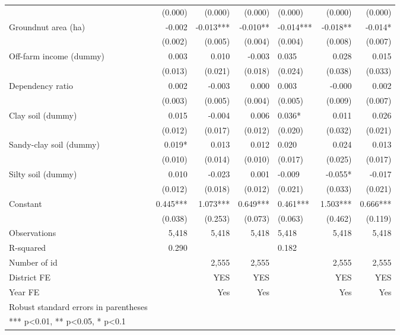 \documentclass[
]{article}
\begin{document}
\begin{landscape}
\begin{longtable}[t]{lrrrlrr}
 & (0.000) & (0.000) & (0.000) & (0.000) & (0.000) & (0.000)\\
Groundnut area (ha) & -0.002 & -0.013*** & -0.010** & -0.014*** & -0.018** & -0.014*\\
\addlinespace
 & (0.002) & (0.005) & (0.004) & (0.004) & (0.008) & (0.007)\\
Off-farm income (dummy) & 0.003 & 0.010 & -0.003 & 0.035 & 0.028 & 0.015\\
 & (0.013) & (0.021) & (0.018) & (0.024) & (0.038) & (0.033)\\
Dependency ratio & 0.002 & -0.003 & 0.000 & 0.003 & -0.000 & 0.002\\
 & (0.003) & (0.005) & (0.004) & (0.005) & (0.009) & (0.007)\\
\addlinespace
Clay soil (dummy) & 0.015 & -0.004 & 0.006 & 0.036* & 0.011 & 0.026\\
 & (0.012) & (0.017) & (0.012) & (0.020) & (0.032) & (0.021)\\
Sandy-clay soil (dummy) & 0.019* & 0.013 & 0.012 & 0.020 & 0.024 & 0.013\\
 & (0.010) & (0.014) & (0.010) & (0.017) & (0.025) & (0.017)\\
Silty soil (dummy) & 0.010 & -0.023 & 0.001 & -0.009 & -0.055* & -0.017\\
\addlinespace
 & (0.012) & (0.018) & (0.012) & (0.021) & (0.033) & (0.021)\\
Constant & 0.445*** & 1.073*** & 0.649*** & 0.461*** & 1.503*** & 0.666***\\
 & (0.038) & (0.253) & (0.073) & (0.063) & (0.462) & (0.119)\\
Observations & 5,418 & 5,418 & 5,418 & 5,418 & 5,418 & 5,418\\
R-squared & 0.290 &  &  & 0.182 &  & \\
\addlinespace
Number of id &  & 2,555 & 2,555 &  & 2,555 & 2,555\\
District FE &  & YES & YES &  & YES & YES\\
Year FE &  & Yes & Yes &  & Yes & Yes\\
Robust standard errors in parentheses &  &  &  &  &  & \\
*** p<0.01, ** p<0.05, * p<0.1 &  &  &  &  &  & \\*
\end{longtable}
\endgroup{}
\end{landscape}
\end{document}
